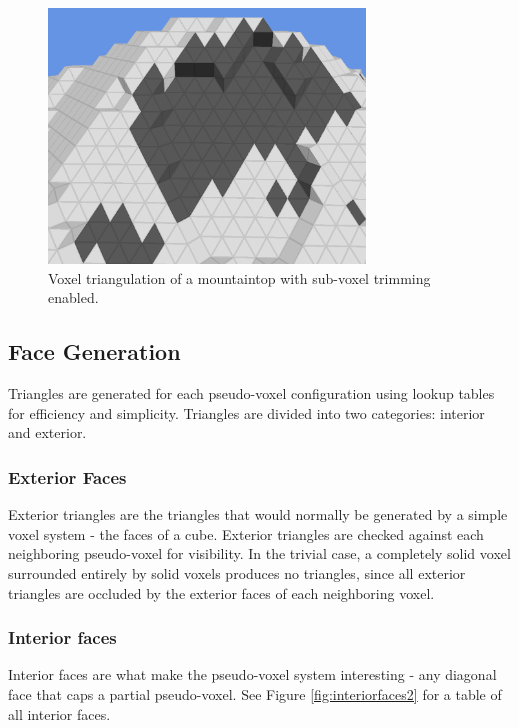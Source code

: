 \begin{figure}
	\centering
		\includegraphics[width=0.75\textwidth]{figures/trimcomparison2.png}
	\caption{
		Voxel triangulation of a mountaintop with sub-voxel trimming enabled.
	}
	\label{fig:trimcomparison2}
\end{figure}

\subsection{Face Generation}

Triangles are generated for each pseudo-voxel configuration using lookup tables for efficiency and simplicity.
Triangles are divided into two categories: interior and exterior.

\subsubsection{Exterior Faces}

Exterior triangles are the triangles that would normally be generated by a simple voxel system - the faces of a cube.
Exterior triangles are checked against each neighboring pseudo-voxel for visibility.
In the trivial case, a completely solid voxel surrounded entirely by solid voxels produces no triangles, since all exterior triangles are occluded by the exterior faces of each neighboring voxel.

\subsubsection{Interior faces}

Interior faces are what make the pseudo-voxel system interesting - any diagonal face that caps a partial pseudo-voxel.
See Figure \ref{fig:interiorfaces2} for a table of all interior faces.

